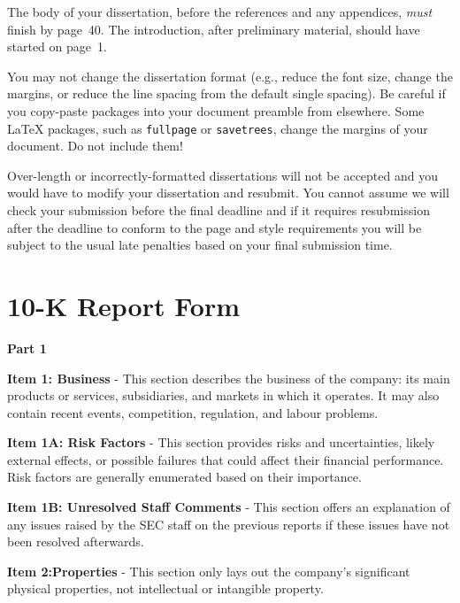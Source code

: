 \documentclass[logo,bsc,singlespacing,parskip]{infthesis}
\begin{document}
The body of your dissertation, before the references and any appendices,
\emph{must} finish by page~40. The introduction, after preliminary material,
should have started on page~1.

You may not change the dissertation format (e.g., reduce the font size, change
the margins, or reduce the line spacing from the default single spacing). Be
careful if you copy-paste packages into your document preamble from elsewhere.
Some \LaTeX{} packages, such as \texttt{fullpage} or \texttt{savetrees}, change
the margins of your document. Do not include them!

Over-length or incorrectly-formatted dissertations will not be accepted and you
would have to modify your dissertation and resubmit. You cannot assume we will
check your submission before the final deadline and if it requires resubmission
after the deadline to conform to the page and style requirements you will be
subject to the usual late penalties based on your final submission time.

% 
% 




\appendix

\chapter{10-K Report Form}
\cite{sec2010k, wiki10k}
\label{appendix_10-k}

\textbf{Part 1}

\textbf{Item 1: Business} - This section describes the business of the company: its main products or services, subsidiaries, and markets in which it operates. It may also contain recent events, competition, regulation, and labour problems. 

\textbf{Item 1A: Risk Factors} - This section provides risks and uncertainties, likely external effects, or possible failures that could affect their financial performance. Risk factors are generally enumerated based on their importance. 

\textbf{Item 1B: Unresolved Staff Comments} - This section offers an explanation of any issues raised by the SEC staff on the previous reports if these issues have not been resolved afterwards.

\textbf{Item 2:Properties} - This section only lays out the company’s significant physical properties, not intellectual or intangible property.
\end{document}
